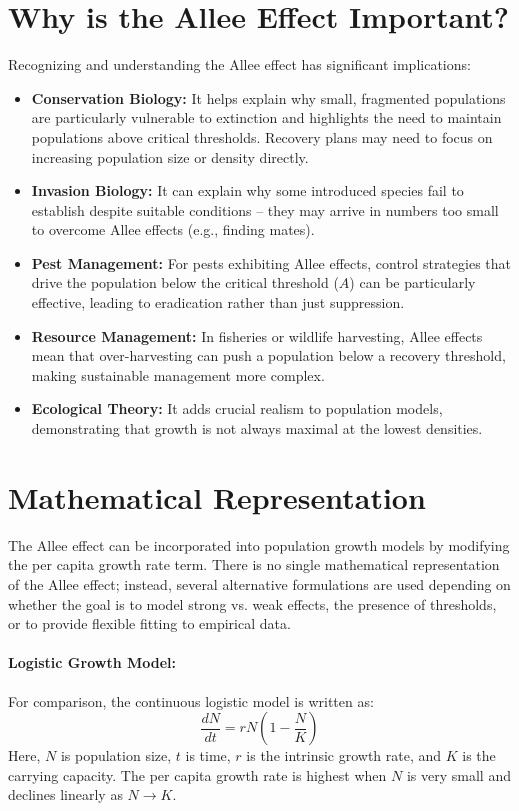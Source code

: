 \documentclass{article}
\begin{document}
\section{Why is the Allee Effect Important?}

Recognizing and understanding the Allee effect has significant implications:

\begin{itemize}
    \item \textbf{Conservation Biology:} It helps explain why small, fragmented populations are particularly vulnerable to extinction and highlights the need to maintain populations above critical thresholds. Recovery plans may need to focus on increasing population size or density directly.
    \item \textbf{Invasion Biology:} It can explain why some introduced species fail to establish despite suitable conditions – they may arrive in numbers too small to overcome Allee effects (e.g., finding mates).
    \item \textbf{Pest Management:} For pests exhibiting Allee effects, control strategies that drive the population below the critical threshold ($A$) can be particularly effective, leading to eradication rather than just suppression.
    \item \textbf{Resource Management:} In fisheries or wildlife harvesting, Allee effects mean that over-harvesting can push a population below a recovery threshold, making sustainable management more complex.
    \item \textbf{Ecological Theory:} It adds crucial realism to population models, demonstrating that growth is not always maximal at the lowest densities.
\end{itemize}

\section{Mathematical Representation}

The Allee effect can be incorporated into population growth models by modifying the per capita growth rate term. There is no single mathematical representation of the Allee effect; instead, several alternative formulations are used depending on whether the goal is to model strong vs. weak effects, the presence of thresholds, or to provide flexible fitting to empirical data.

\paragraph{Logistic Growth Model:}
For comparison, the continuous logistic model is written as:
\[
\frac{dN}{dt} = rN\left(1 - \frac{N}{K}\right)
\]
Here, $N$ is population size, $t$ is time, $r$ is the intrinsic growth rate, and $K$ is the carrying capacity. The per capita growth rate is highest when $N$ is very small and declines linearly as $N \to K$.
\end{document}
